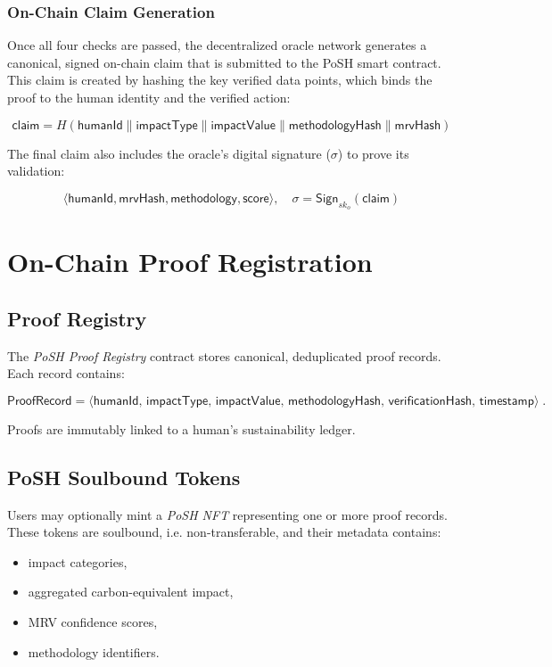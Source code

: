 \documentclass[11pt,a4paper]{report}
\theoremstyle{definition}
\theoremstyle{remark}
\begin{document}
\subsubsection{On-Chain Claim Generation}

Once all four checks are passed, the decentralized oracle network generates a canonical, signed on-chain claim that is submitted to the PoSH smart contract. This claim is created by hashing the key verified data points, which binds the proof to the human identity and the verified action:

\[
\mathsf{claim} = H(\mathsf{humanId} \parallel \mathsf{impactType} \parallel \mathsf{impactValue} \parallel \mathsf{methodologyHash} \parallel \mathsf{mrvHash})
\]

The final claim also includes the oracle's digital signature ($\sigma$) to prove its validation:

\[
\langle \mathsf{humanId}, \mathsf{mrvHash}, \mathsf{methodology}, \mathsf{score} \rangle, \quad \sigma = \mathsf{Sign}_{sk_o}(\mathsf{claim})
\]

\section{On-Chain Proof Registration}

\subsection{Proof Registry}

The \emph{PoSH Proof Registry} contract stores canonical, deduplicated proof
records. Each record contains:

\[
\mathsf{ProofRecord} =
\langle 
\mathsf{humanId},\,
\mathsf{impactType},\,
\mathsf{impactValue},\,
\mathsf{methodologyHash},\,
\mathsf{verificationHash},\,
\mathsf{timestamp}
\rangle \; .
\]

Proofs are immutably linked to a human’s sustainability ledger.

\subsection{PoSH Soulbound Tokens}

Users may optionally mint a \emph{PoSH NFT} representing one or more proof
records. These tokens are soulbound, i.e. non-transferable, and their metadata
contains:

\begin{itemize}[leftmargin=*]
    \item impact categories,
    \item aggregated carbon-equivalent impact,
    \item MRV confidence scores,
    \item methodology identifiers.
\end{itemize}
\end{document}
